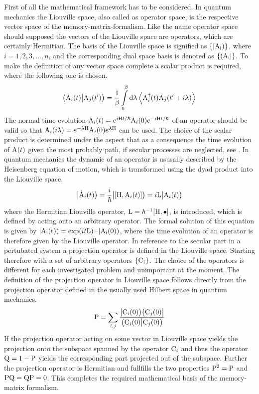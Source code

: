 First of all the mathematical framework has to be considered.
In quantum mechanics the Liouville space, also called as operator space, is the respective vector space of the memory-matrix-formalism.
Like the name operator space should supposed the vectors of the Liouville space are operators, which are certainly Hermitian.
The basis of the Liouville space is signified as $\{|\mathrm{\mathrm{A}_{i}})\}$, where $i = 1,2,3,\dots,n$, and the corresponding dual space basis is denoted as $\{(\mathrm{\mathrm{A}_{i}}|\}$.
To make the definition of any vector space complete a scalar product is required, where the following one is chosen.
%
\begin{align}
	\big({\mathrm{A}_{i}(t)}\big|{\mathrm{A}_{j}(t')}\big) = \frac{1}{\beta} \int\limits_{0}^{\beta} \dd{\lambda} \expval{\mathrm{A}_{i}^{\dag}(t) \mathrm{A}_{j}(t'+i\lambda)}
	\label{eq:scalar product Liouville space}
\end{align}
%
The normal time evolution $\mathrm{A}_{i}(t) = e^{i\mathrm{H}t/\hbar} \mathrm{A}_{i}(0) e^{-i\mathrm{H}t/\hbar}$ of an operator should be valid so that $\mathrm{A}_{i}(i\lambda) = e^{-\lambda\mathrm{H}} \mathrm{A}_{i}(0) e^{\lambda\mathrm{H}}$ can be used.
The choice of the scalar product is determined under the aspect that as a consequence the time evolution of $\mathrm{A}(t)$ given the most probably path, if secular processes are neglected, see \cite{Mori}.
In quantum mechanics the dynamic of an operator is ususally described by the Heisenberg equation of motion, which is transformed using the dyad product into the Liouville space.
%
\begin{align}
	\oket{\dot{\mt{A}}_{i}(t)} = \frac{i}{\hbar} \oket{\comm{\mt{H}}{\mt{A}_{i}(t)}} = i \mt{L} \oket{\mt{A}_{i}(t)}
	\label{eq:HEM in LS}
\end{align}
%
where the Hermitian Liouville operator, ${\mt{L} = \hbar^{-1} \comm{\mt{H}}{\mt{\bullet}}}$, is introduced, which is defined by acting onto an arbitrary operator.
The formal solution of this equation is given by $|\mathrm{\mathrm{A}_{i}(t)}) = \exp(it\mathrm{L}) \cdot |\mathrm{\mathrm{A}_{i}(0)})$, where the time evolution of an operator is therefore given by the Liouville operator.
In reference to the secular part in a pertubated system a projection operator is defined in the Liouville space.
Starting therefore with a set of arbitrary operators $\{\mathrm{C}_{i}\}$. 
The choice of the operators is different for each investigated problem and unimportant at the moment.
The definition of the projection operator in Liouville space follows directly from the projection operator defined in the usually used Hilbert space in quantum mechanics.
%
\begin{align}
	\mathrm{P} = \sum\limits_{i,j} \frac{\big|{\mathrm{C}_{i}(0)}\big) \big({\mathrm{C}_{j}(0)}\big|}{\big({\mathrm{C}_{i}(0)}\big|{\mathrm{C}_{j}(0)}\big)} 
	\label{eq:projection operator}
\end{align}
%
If the projection operator acting on some vector in Liouville space yields the projection onto the subspace spanned by the operator $\mathrm{C}_{i}$ and thus the operator $\mathrm{Q} = 1 - \mathrm{P}$ yields the corresponding part projected out of the subspace.
Further the projection operator is Hermitian and fullfills the two properties $\mathrm{P}^{2} = \mathrm{P}$ and $\mathrm{PQ} = \mathrm{QP} = 0$.
This completes the required mathematical basis of the memory-matrix formalism.

